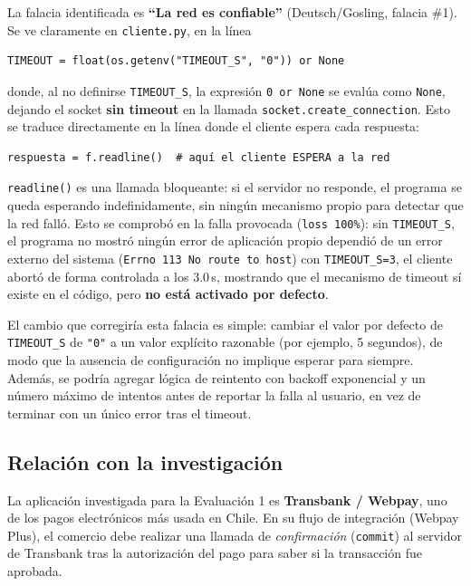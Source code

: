 La falacia identificada es \textbf{``La red es confiable''}
(Deutsch/Gosling, falacia \#1). Se ve claramente en \texttt{cliente.py},
en la línea

\begin{verbatim}
TIMEOUT = float(os.getenv("TIMEOUT_S", "0")) or None
\end{verbatim}

donde, al no definirse \texttt{TIMEOUT\_S}, la expresión \texttt{0 or None}
se evalúa como \texttt{None}, dejando el socket \textbf{sin timeout} en la
llamada \texttt{socket.create\_connection}. Esto se traduce directamente en
la línea donde el cliente espera cada respuesta:

\begin{verbatim}
respuesta = f.readline()  # aquí el cliente ESPERA a la red
\end{verbatim}

\texttt{readline()} es una llamada bloqueante: si el servidor no responde,
el programa se queda esperando indefinidamente, sin ningún mecanismo
propio para detectar que la red falló. Esto se comprobó en la falla
provocada (\texttt{loss 100\%}): sin \texttt{TIMEOUT\_S}, el programa no
mostró ningún error de aplicación propio dependió de un error externo del
sistema (\texttt{Errno 113 No route to host}) con \texttt{TIMEOUT\_S=3},
el cliente abortó de forma controlada a los 3.0\,s, mostrando que el
mecanismo de timeout sí existe en el código, pero \textbf{no está activado
por defecto}.

El cambio que corregiría esta falacia es simple: cambiar el valor por
defecto de \texttt{TIMEOUT\_S} de \texttt{"0"} a un valor explícito
razonable (por ejemplo, 5 segundos), de modo que la ausencia de
configuración no implique esperar para siempre. Además, se podría agregar
lógica de reintento con backoff exponencial y un número máximo de
intentos antes de reportar la falla al usuario, en vez de terminar con un
único error tras el timeout.

\subsection{Relación con la investigación}

La aplicación investigada para la Evaluación 1 es \textbf{Transbank / Webpay}, uno de los pagos electrónicos más usada en Chile. En su flujo de integración
(Webpay Plus), el comercio debe realizar una llamada de \emph{confirmación}
(\texttt{commit}) al servidor de Transbank tras la autorización del pago para
saber si la transacción fue aprobada.

